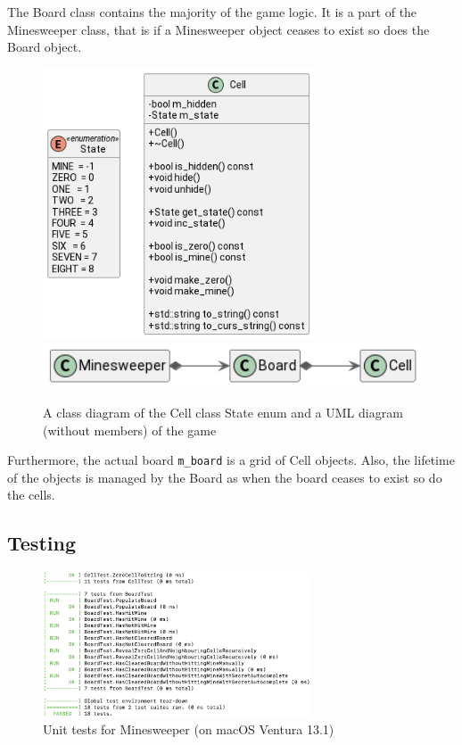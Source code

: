 \documentclass[12pt]{article}
\begin{document}
The Board class contains the majority of the game logic. It is a
part of the Minesweeper class, that is if a Minesweeper object
ceases to exist so does the Board object.

\begin{figure}[H]
    \centering
    \includegraphics[height=8cm]{minesweeper-uml/cell.png}
    \includegraphics[width=12cm]{minesweeper-uml/relations.png}
    \caption{A class diagram of the Cell class State enum and a
    UML diagram (without members) of the game}
\end{figure}

Furthermore, the actual board \texttt{m\_board} is a grid of
Cell objects. Also, the lifetime of the objects is managed by
the Board as when the board ceases to exist so do the cells.

\subsection{Testing}

\begin{figure}[H]
    \centering
    \includegraphics[width=8cm]{./images/unit-tests-minesweeper.png}
    \caption{Unit tests for Minesweeper (on macOS Ventura 13.1)}
\end{figure}
\end{document}
